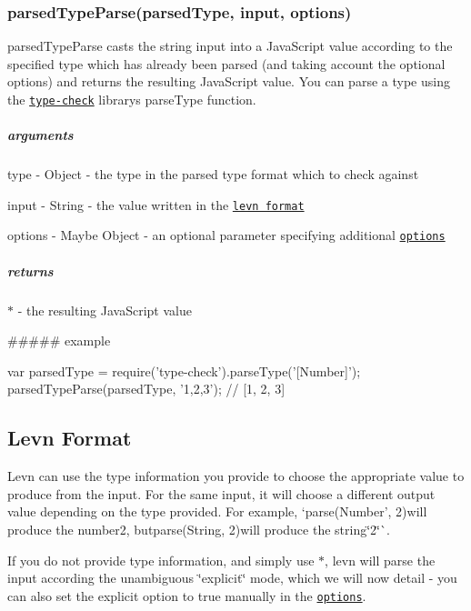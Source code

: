 \subsubsection*{parsed\+Type\+Parse(parsed\+Type, input, options)}

{\ttfamily parsed\+Type\+Parse} casts the string {\ttfamily input} into a Java\+Script value according to the specified {\ttfamily type} which has already been parsed (and taking account the optional {\ttfamily options}) and returns the resulting Java\+Script value. You can parse a type using the \href{https://github.com/gkz/type-check}{\tt type-\/check} library\textquotesingle{}s {\ttfamily parse\+Type} function.

\subparagraph*{arguments}


\begin{DoxyItemize}
\item type -\/ {\ttfamily Object} -\/ the type in the parsed type format which to check against
\item input -\/ {\ttfamily String} -\/ the value written in the \href{#levn-format}{\tt levn format}
\item options -\/ {\ttfamily Maybe Object} -\/ an optional parameter specifying additional \href{#options}{\tt options}
\end{DoxyItemize}

\subparagraph*{returns}

{\ttfamily $\ast$} -\/ the resulting Java\+Script value

\#\#\#\#\# example 
\begin{DoxyCode}
var parsedType = require('type-check').parseType('[Number]');
parsedTypeParse(parsedType, '1,2,3'); // [1, 2, 3]
\end{DoxyCode}


\subsection*{Levn Format}

Levn can use the type information you provide to choose the appropriate value to produce from the input. For the same input, it will choose a different output value depending on the type provided. For example, `parse(\textquotesingle{}Number', \textquotesingle{}2\textquotesingle{}){\ttfamily will produce the number}2{\ttfamily , but}parse(\textquotesingle{}String\textquotesingle{}, \textquotesingle{}2\textquotesingle{}){\ttfamily will produce the string}\char`\"{}2\char`\"{}\`{}.

If you do not provide type information, and simply use {\ttfamily $\ast$}, levn will parse the input according the unambiguous \char`\"{}explicit\char`\"{} mode, which we will now detail -\/ you can also set the {\ttfamily explicit} option to true manually in the \href{#options}{\tt options}.


